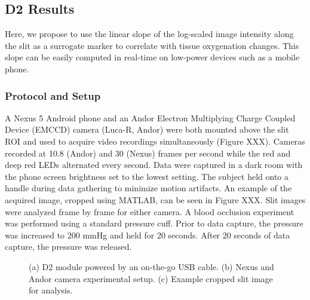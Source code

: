     \subsection{D2 Results}
    Here, we propose to use the linear slope of the log-scaled image intensity along the slit as a surrogate marker to correlate with tissue oxygenation changes. This slope can be easily computed in real-time on low-power devices such as a mobile phone.
    
        \subsubsection{Protocol and Setup}
        A Nexus 5 Android phone and an Andor Electron Multiplying Charge Coupled Device (EMCCD) camera (Luca-R, Andor) were both mounted above the slit ROI and used to acquire video recordings simultaneously (Figure XXX). Cameras recorded at 10.8 (Andor) and 30 (Nexus) frames per second while the red and deep red LEDs alternated every second. Data were captured in a dark room with the phone screen brightness set to the lowest setting. The subject held onto a handle during data gathering to minimize motion artifacts. An example of the acquired image, cropped using MATLAB, can be seen in Figure XXX. Slit images were analyzed frame by frame for either camera. A blood occlusion experiment was performed using a standard pressure cuff. Prior to data capture, the pressure was increased to 200 mmHg and held for 20 seconds. After 20 seconds of data capture, the pressure was released. 
        \begin{figure}
            \begin{center}
            \end{center}
            \caption{(a) D2 module powered by an on-the-go USB cable. (b) Nexus and Andor camera experimental setup. (c) Example cropped slit image for analysis.} 
            \label{fig:D2protocol}
        \end{figure} 
        
